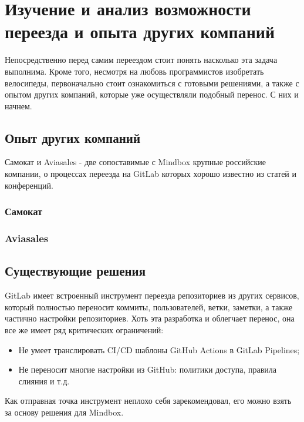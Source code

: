 \chapter{Изучение и анализ возможности переезда и опыта других компаний} \label{ch:ch1}
Непосредственно перед самим переездом стоит понять насколько эта задача выполнима.
Кроме того, несмотря на любовь программистов изобретать велосипеды,
первоначально стоит ознакомиться с готовыми решениями, а также с опытом других компаний,
которые уже осуществляли подобный перенос.
С них и начнем.


\section{Опыт других компаний}\label{sec:other-companies-expirience}
Самокат и Aviasales - две сопоставимые с Mindbox крупные российские компании,
о процессах переезда на GitLab которых хорошо известно из статей и конференций.

\subsection{Самокат}\label{subsec:samokat-experience}

\subsection{Aviasales}\label{subsec:aviasales-experience}


\section{Существующие решения}\label{sec:existing-solutions}
GitLab имеет встроенный инструмент переезда репозиториев из других сервисов,
который полностью переносит коммиты, пользователей, ветки, заметки, а также частично настройки репозиториев.
Хоть эта разработка и облегчает перенос, она все же имеет ряд критических ограничений:
\begin{itemize}
  \item Не умеет транслировать CI/CD шаблоны GitHub Actions в GitLab Pipelines;
  \item Не переносит многие настройки из GitHub: политики доступа, правила слияния и т.д.
\end{itemize}
Как отправная точка инструмент неплохо себя зарекомендовал, его можно взять за основу решения для Mindbox.
